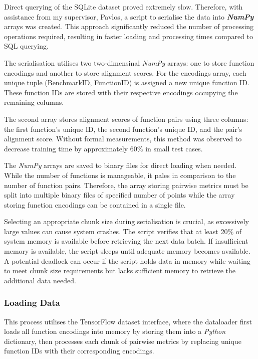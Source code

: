 Direct querying of the SQLite dataset proved extremely slow. Therefore, with assistance from my supervisor, Pavlos, a script to serialise the data into \textbf{\textit{NumPy}} arrays was created. This approach significantly reduced the number of processing operations required, resulting in faster loading and processing times compared to SQL querying.

The serialisation utilises two two-dimensinal \textit{NumPy} arrays: one to store function encodings and another to store alignment scores. For the encodings array, each unique tuple (BenchmarkID, FunctionID) is assigned a new unique function ID. These function IDs are stored with their respective encodings occupying the remaining columns.

The second array stores alignment scores of function pairs using three columns: the first function's unique ID, the second function's unique ID, and the pair's alignment score. Without formal measurements, this method was observed to decrease training time by approximately 60\% in small test cases.

The \textit{NumPy} arrays are saved to binary files for direct loading when needed. While the number of functions is manageable, it pales in comparison to the number of function pairs. Therefore, the array storing pairwise metrics must be split into multiple binary files of specified number of points while the array storing function encodings can be contained in a single file.

Selecting an appropriate chunk size during serialisation is crucial, as excessively large values can cause system crashes. The script verifies that at least 20\% of system memory is available before retrieving the next data batch. If insufficient memory is available, the script sleeps until adequate memory becomes available. A potential deadlock can occur if the script holds data in memory while waiting to meet chunk size requirements but lacks sufficient memory to retrieve the additional data needed.


\subsubsection{Loading Data}
This process utilises the TensorFlow dataset interface, where the dataloader first loads all function encodings into memory by storing them into a \textit{Python} dictionary, then processes each chunk of pairwise metrics by replacing unique function IDs with their corresponding encodings.

